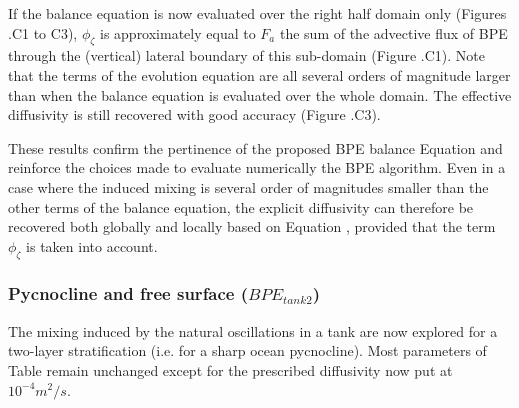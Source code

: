 If the balance equation is now evaluated over the right half domain only (Figures .C1 to C3), $\phi_{\zeta}$ is approximately equal to $F_a$ the sum of the advective flux of BPE through the (vertical) lateral boundary of this sub-domain (Figure .C1). Note that the terms of the evolution equation are all several orders of magnitude larger than when the balance equation is evaluated over the whole domain. The effective diffusivity is still recovered with good accuracy (Figure .C3).

These results confirm the pertinence of the proposed BPE balance Equation  and reinforce the choices made to evaluate numerically the BPE algorithm. Even in a case where the induced mixing is several order of magnitudes smaller than the other terms of the balance equation, the explicit diffusivity can therefore be recovered both globally and locally based on Equation , provided that the term $\phi_{\zeta}$ is taken into account.

\subsubsection{Pycnocline and free surface ({$BPE_{tank2}$})}
The mixing induced by the natural oscillations in a tank are now explored for a two-layer stratification (i.e. for a sharp ocean pycnocline). Most parameters of Table  remain unchanged except for the prescribed diffusivity now put at $10^{-4}m^2/s$.

